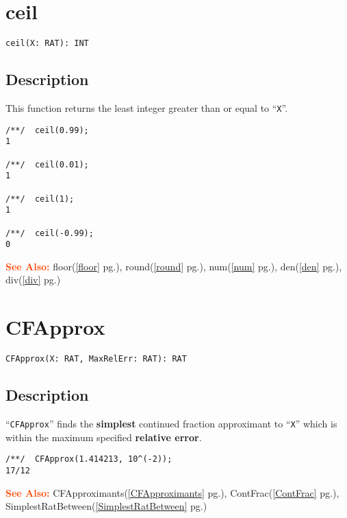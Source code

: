 \documentclass[a4paper]{mybook}
\newenvironment{command}{}{} %
\newcommand\SeeAlso{\par\textcolor{OrangeRed}{\textbf{\large See Also: }}}
\begin{document}
\section{ceil}
\label{ceil}
\begin{command} %


\begin{Verbatim}[label=syntax, rulecolor=\color{MidnightBlue},
frame=single]
ceil(X: RAT): INT
\end{Verbatim}


\subsection*{Description}

This function returns the least integer greater than or equal to ``\verb&X&''.
\begin{Verbatim}[label=example, rulecolor=\color{PineGreen}, frame=single]
/**/  ceil(0.99);
1

/**/  ceil(0.01);
1

/**/  ceil(1);
1

/**/  ceil(-0.99);
0
\end{Verbatim}


\SeeAlso %
  floor(\ref{floor} pg.\pageref{floor}), 
    round(\ref{round} pg.\pageref{round}), 
    num(\ref{num} pg.\pageref{num}), 
    den(\ref{den} pg.\pageref{den}), 
    div(\ref{div} pg.\pageref{div})
\end{command} %

\section{CFApprox}
\label{CFApprox}
\begin{command} %


\begin{Verbatim}[label=syntax, rulecolor=\color{MidnightBlue},
frame=single]
CFApprox(X: RAT, MaxRelErr: RAT): RAT
\end{Verbatim}


\subsection*{Description}

``\verb&CFApprox&'' finds the \textbf{simplest} continued fraction approximant
to ``\verb&X&'' which is within the maximum specified \textbf{relative error}.
\begin{Verbatim}[label=example, rulecolor=\color{PineGreen}, frame=single]
/**/  CFApprox(1.414213, 10^(-2));
17/12
\end{Verbatim}


\SeeAlso %
  CFApproximants(\ref{CFApproximants} pg.\pageref{CFApproximants}), 
    ContFrac(\ref{ContFrac} pg.\pageref{ContFrac}), 
    SimplestRatBetween(\ref{SimplestRatBetween} pg.\pageref{SimplestRatBetween})
\end{command} %
\end{document}
